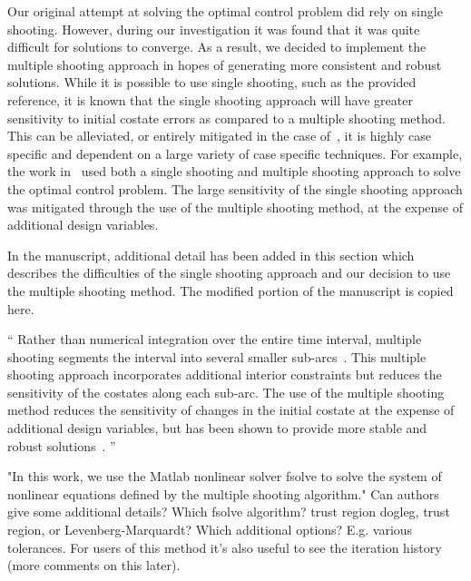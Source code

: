 \documentclass[11pt]{article}
\newenvironment{correction}{\begin{list}{}{\setlength{\leftmargin}{1cm}\setlength{\rightmargin}{1cm}}\vspace{\parsep}\item[]``}{''\end{list}}
\begin{document}
\begin{enumerate}
Our original attempt at solving the optimal control problem did rely on single shooting.
However, during our investigation it was found that it was quite difficult for solutions to converge.
As a result, we decided to implement the multiple shooting approach in hopes of generating more consistent and robust solutions.
While it is possible to use single shooting, such as the provided reference, it is known that the single shooting approach will have greater sensitivity to initial costate errors as compared to a multiple shooting method.
This can be alleviated, or entirely mitigated in the case of~\cite{ranieri2006}, it is highly case specific and dependent on a large variety of case specific techniques. 
For example, the work in~\cite{ozimek2010a} used both a single shooting and multiple shooting approach to solve the optimal control problem.
The large sensitivity of the single shooting approach was mitigated through the use of the multiple shooting method, at the expense of additional design variables.

In the manuscript, additional detail has been added in this section which describes the difficulties of the single shooting approach and our decision to use the multiple shooting method.
The modified portion of the manuscript is copied here.
\begin{correction}
Rather than numerical integration over the entire time interval, multiple shooting segments the interval into several smaller sub-arcs~\cite{stoer2013}.
This multiple shooting approach incorporates additional interior constraints but reduces the sensitivity of the costates along each sub-arc.
The use of the multiple shooting method reduces the sensitivity of changes in the initial costate at the expense of additional design variables, but has been shown to provide more stable and robust solutions~\cite{ozimek2010a}.
\end{correction}

\item
    \begin{itshape}
"In this work, we use the Matlab nonlinear solver fsolve to solve the system of nonlinear equations defined by the multiple shooting algorithm."  Can authors give some additional details?  Which fsolve algorithm? trust region dogleg,  trust region, or Levenberg-Marquardt?  Which additional options?  E.g. various tolerances.  For users of this method it's also useful to see the iteration history (more comments on this later).
\end{itshape}


\end{enumerate}
\end{document}
